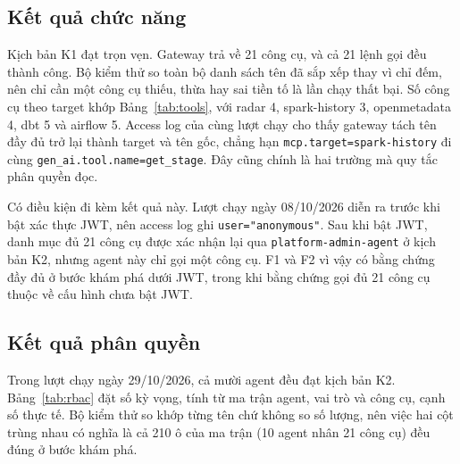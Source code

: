 \documentclass[a4paper]{article}
\begin{document}
\subsection{Kết quả chức năng}

Kịch bản K1 đạt trọn vẹn. Gateway trả về 21 công cụ, và cả 21 lệnh gọi đều thành công. Bộ kiểm thử so toàn bộ danh sách tên đã sắp xếp thay vì chỉ đếm, nên chỉ cần một công cụ thiếu, thừa hay sai tiền tố là lần chạy thất bại. Số công cụ theo target khớp Bảng~\ref{tab:tools}, với radar 4, spark-history 3, openmetadata 4, dbt 5 và airflow 5. Access log của cùng lượt chạy cho thấy gateway tách tên đầy đủ trở lại thành target và tên gốc, chẳng hạn \texttt{mcp.target=spark-history} đi cùng \texttt{gen\_ai.tool.name=get\_stage}. Đây cũng chính là hai trường mà quy tắc phân quyền đọc.

Có điều kiện đi kèm kết quả này. Lượt chạy ngày 08/10/2026 diễn ra trước khi bật xác thực JWT, nên access log ghi \texttt{user="anonymous"}. Sau khi bật JWT, danh mục đủ 21 công cụ được xác nhận lại qua \texttt{platform-admin-agent} ở kịch bản K2, nhưng agent này chỉ gọi một công cụ. F1 và F2 vì vậy có bằng chứng đầy đủ ở bước khám phá dưới JWT, trong khi bằng chứng gọi đủ 21 công cụ thuộc về cấu hình chưa bật JWT.

\subsection{Kết quả phân quyền}

Trong lượt chạy ngày 29/10/2026, cả mười agent đều đạt kịch bản K2. Bảng~\ref{tab:rbac} đặt số kỳ vọng, tính từ ma trận agent, vai trò và công cụ, cạnh số thực tế. Bộ kiểm thử so khớp từng tên chứ không so số lượng, nên việc hai cột trùng nhau có nghĩa là cả 210 ô của ma trận (10 agent nhân 21 công cụ) đều đúng ở bước khám phá.
\end{document}
